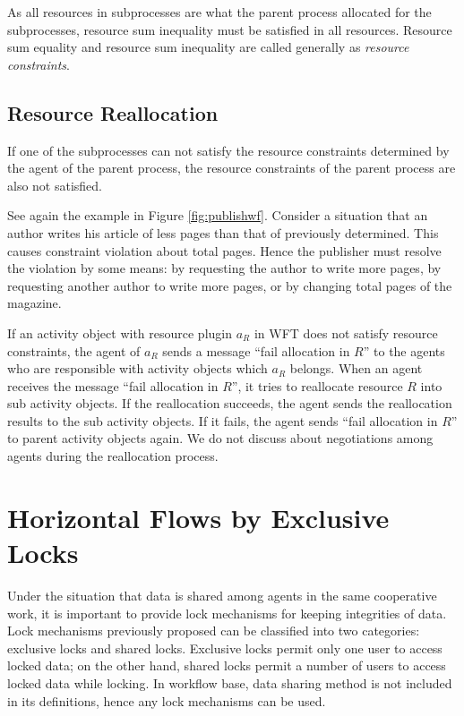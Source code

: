 As all resources in subprocesses are what the parent process allocated
for the subprocesses, resource sum inequality must be satisfied in all
resources.  Resource sum equality and resource sum inequality are called 
generally as \emph{resource constraints}.

\subsection{Resource Reallocation}
\label{sec:realloc}

If one of the subprocesses can not satisfy the resource constraints
determined by the agent of the parent process, the resource constraints
of the parent process are also not satisfied.

See again the example in Figure \ref{fig:publishwf}.  Consider a
situation that an author writes his article of less pages than that of
previously determined.  This causes constraint violation about total
pages.  Hence the publisher must resolve the violation by some means: by
requesting the author to write more pages, by requesting another author
to write more pages, or by changing total pages of the magazine.

If an activity object with resource plugin $a_R$ in WFT does not satisfy
resource constraints, the agent of $a_R$ sends a message ``fail
allocation in $R$'' to the agents who are responsible with activity
objects which $a_R$ belongs.  When an agent receives the message ``fail
allocation in $R$'', it tries to reallocate resource $R$ into sub
activity objects.  If the reallocation succeeds, the agent sends the
reallocation results to the sub activity objects.  If it fails, the
agent sends ``fail allocation in $R$'' to parent activity objects again.
We do not discuss about negotiations among agents during the
reallocation process.

\section{Horizontal Flows by Exclusive Locks}
\label{sec:flowbylock}

Under the situation that data is shared among agents in the same
cooperative work, it is important to provide lock mechanisms for keeping
integrities of data.  Lock mechanisms previously proposed can be
classified into two categories: exclusive locks and shared locks.
Exclusive locks permit only one user to access locked data; on the other
hand, shared locks permit a number of users to access locked data while
locking.  In workflow base, data sharing method is not included in its
definitions, hence any lock mechanisms can be used.

